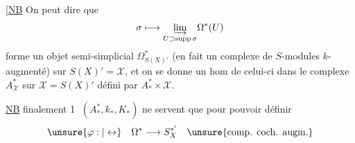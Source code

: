[\uline{NB} On peut dire que
\[
\sigma\longmapsto\underset{U\supset\operatorname{supp}\sigma}{\varinjlim}\Omega^*(U)
\]
forme un  objet semi-simplicial
$\Omega^*_{S(X)'}$ (en fait un complexe de $S$-modules
$k$-augmenté) sur $S(X)'=\mathcal X$,
et on se donne un hom de celui-ci dans le complexe 
$A^*_{\mathcal X}$ sur $\mathcal X=S(X)'$ défini par
$A_*^*\times\mathcal X$.


\uline{NB} finalement \textcircled{1} $(A_*^*,k_*,K_*)$
 ne servent que pour pouvoir définir
\[
\unsure{\varphi:|\leftrightarrow}\quad\Omega^*\longrightarrow S_X^{*'}
\quad\unsure{\text{comp. coch. augm.}}
\]
